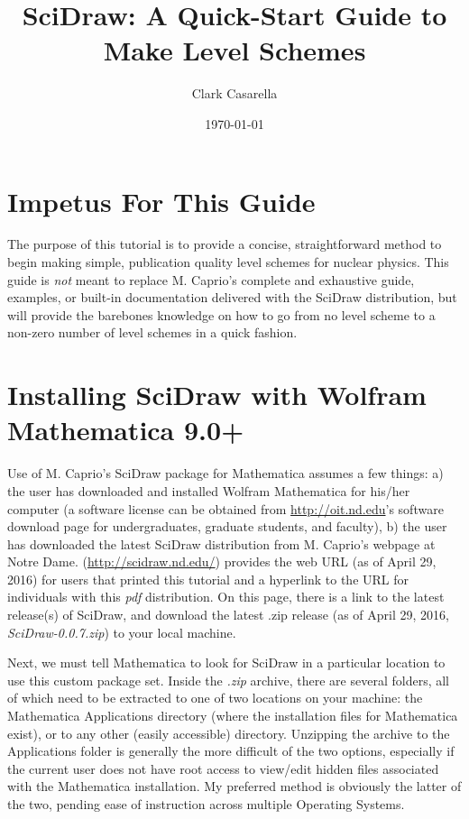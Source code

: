 \documentclass[portrait,10pt]{article}
\begin{document}

\date{\today}
\title{SciDraw: A Quick-Start Guide to Make Level Schemes}
\author{Clark Casarella}
\maketitle
\section{Impetus For This Guide}

The purpose of this tutorial is to provide a concise, straightforward method to begin making simple, publication quality level schemes for nuclear physics. This guide is \textit{not} meant to replace M. Caprio's complete and exhaustive guide, examples, or built-in documentation delivered with the SciDraw distribution, but will provide the barebones knowledge on how to go from no level scheme to a non-zero number of level schemes in a quick fashion.
\section{Installing SciDraw with Wolfram Mathematica 9.0+}

Use of M. Caprio's SciDraw package for Mathematica assumes a few things: a) the user has downloaded and installed Wolfram Mathematica for his/her computer (a software license can be obtained from \url{http://oit.nd.edu}'s software download page for undergraduates, graduate students, and faculty), b) the user has downloaded the latest SciDraw distribution from M. Caprio's webpage at Notre Dame. (\url{http://scidraw.nd.edu/}) provides the web URL (as of April 29, 2016) for users that printed this tutorial and a hyperlink to the URL for individuals with this \textit{pdf} distribution. On this page, there is a link to the latest release(s) of SciDraw, and download the latest .zip release (as of April 29, 2016, \textit{SciDraw-0.0.7.zip}) to your local machine. 

Next, we must tell Mathematica to look for SciDraw in a particular location to use this custom package set. Inside the \textit{.zip} archive, there are several folders, all of which need to be extracted to one of two locations on your machine: the Mathematica Applications directory (where the installation files for Mathematica exist), or to any other (easily accessible) directory. Unzipping the archive to the Applications folder is generally the more difficult of the two options, especially if the current user does not have root access to view/edit hidden files associated with the Mathematica installation. My preferred method is obviously the latter of the two, pending ease of instruction across multiple Operating Systems.
\end{document}
